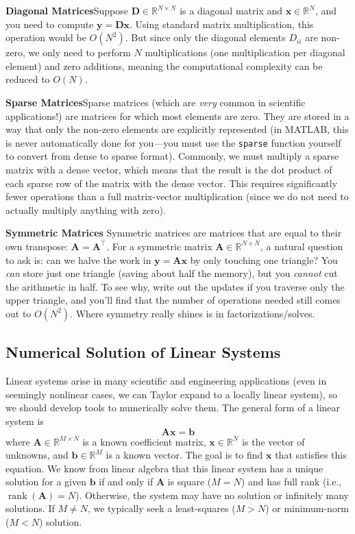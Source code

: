 \textbf{Diagonal Matrices}\quad Suppose $ \mathbf{D} \in \mathbb{R}^{N \times N} $ is a diagonal matrix and $\mathbf{x}\in \mathbb{R}^N$, and you need to compute $ \mathbf{y} = \mathbf{D}\mathbf{x} $. Using standard matrix multiplication, this operation would be $ O(N^2) $. But since only the diagonal elements $ D_{ii} $ are non-zero, we only need to perform $ N $ multiplications (one multiplication per diagonal element) and zero additions, meaning the computational complexity can be reduced to $ O(N) $.

\textbf{Sparse Matrices}\quad Sparse matrices (which are \textit{very} common in scientific applications!) are matrices for which most elements are zero. They are stored in a way that only the non-zero elements are explicitly represented (in MATLAB, this is never automatically done for you---you must use the \verb|sparse| function yourself to convert from dense to sparse format). Commonly, we must multiply a sparse matrix with a dense vector, which means that the result is the dot product of each sparse row of the matrix with the dense vector. This requires significantly fewer operations than a full matrix-vector multiplication (since we do not need to actually multiply anything with zero).

\textbf{Symmetric Matrices}\quad
Symmetric matrices are matrices that are equal to their own transpose: $ \mathbf{A} = \mathbf{A}^\top $. For a symmetric matrix $ \mathbf{A} \in \mathbb{R}^{N\times N} $, a natural question to ask is: can we halve the work in $\mathbf{y}=\mathbf{A}\mathbf{x}$ by only touching one triangle?  You \emph{can} store just one triangle (saving about half the memory), but you \emph{cannot} cut the arithmetic in half. To see why, write out the updates if you traverse only the upper triangle, and you'll find that the number of operations needed still comes out to $O(N^2)$. Where symmetry really shines is in factorizations/solves.
    

\subsection{Numerical Solution of Linear Systems}
Linear systems arise in many scientific and engineering applications (even in seemingly nonlinear cases, we can Taylor expand to a locally linear system), so we should develop tools to numerically solve them. The general form of a linear system is
\begin{equation}
    \mathbf{A}\mathbf{x} = \mathbf{b}
    \label{eq:linear-system}
\end{equation}
where $ \mathbf{A} \in \mathbb{R}^{M \times N} $ is a known coefficient matrix, $ \mathbf{x} \in \mathbb{R}^N $ is the vector of unknowns, and $ \mathbf{b} \in \mathbb{R}^M $ is a known vector. The goal is to find $ \mathbf{x} $ that satisfies this equation. We know from linear algebra that this linear system has a unique solution for a given $\mathbf{b}$ if and only if $ \mathbf{A} $ is square ($M=N$) and has full rank (i.e., $\operatorname{rank}(\mathbf{A})=N$). Otherwise, the system may have no solution or infinitely many solutions. If $M\ne N$, we typically seek a least-squares ($M>N$) or minimum-norm ($M<N$) solution.

